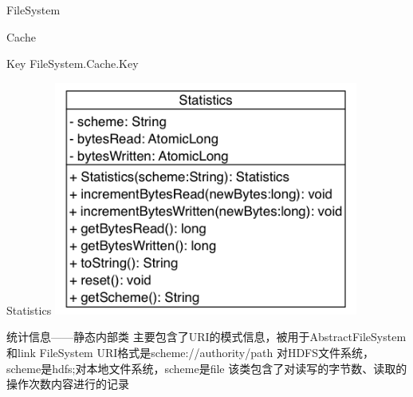 \begin{XeClass}{FileSystem}
\begin{XeInnerClass}{Cache}
\begin{XeInnerClass}{Key}
 FileSystem.Cache.Key

        \end{XeInnerClass}
    \end{XeInnerClass}
    \begin{XeInnerClass}{Statistics}
\includegraphics[width=10cm]{cdig/Statistics.png}
         
 统计信息——静态内部类
 主要包含了URI的模式信息，被用于AbstractFileSystem和link FileSystem
 URI格式是scheme://authority/path
 对HDFS文件系统，scheme是hdfs;对本地文件系统，scheme是file
 该类包含了对读写的字节数、读取的操作次数内容进行的记录

    \end{XeInnerClass}
\end{XeClass}
